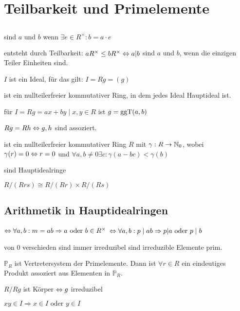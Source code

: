 \section{Teilbarkeit und Primelemente}
\subsection{}
 sind $a$ und $b$ wenn $\exists e \in R^\times: b=a\cdot e$

 entsteht durch Teilbarkeit: $aR^\times \leq bR^\times \Leftrightarrow a|b$
 sind $a$ und $b$, wenn die einzigen Teiler Einheiten sind.

 $I$ ist ein Ideal, für das gilt: $I=Rg=(g)$

 ist ein nullteilerfreier kommutativer Ring, in dem jedes Ideal Hauptideal ist.

 für $I=Rg={ax+by \mid x,y \in R}$ ist $g=\operatorname{ggT}(a,b)$

 $Rg=Rh \Leftrightarrow g,h$ sind assoziert. 

 ist ein nullteilerfreier kommutativer Ring $R$ mit $\gamma:R\to \mathbb N_0$, wobei $\gamma(r)=0 \Leftrightarrow r=0$ und $\forall a,b \neq 0 \exists c: \gamma(a-bc)<\gamma(b)$

 sind Hauptidealringe

 $R/(Rrs) \cong R/(Rr) \times R/(Rs)$

\subsection{Arithmetik in Hauptidealringen}

 $\Leftrightarrow \forall a,b: m=ab \Rightarrow a \text{ oder } b \in R^\times$
 $\Leftrightarrow \forall a,b: p \mid ab \Rightarrow p|a \text{ oder } p \mid b$

 von 0 verschieden sind immer irreduzibel
 sind irreduzible Elemente prim.

 $\mathbb{P}_R$ ist Vertretersystem der Primelemente. Dann ist $\forall r\in R$ ein eindeutiges Produkt assoziert aus Elementen in $\mathbb{P}_R$.

 $R/Rg$ ist Körper $\Leftrightarrow g$ irreduzibel

 $xy\in I \Rightarrow x\in I \text{ oder } y \in I$






